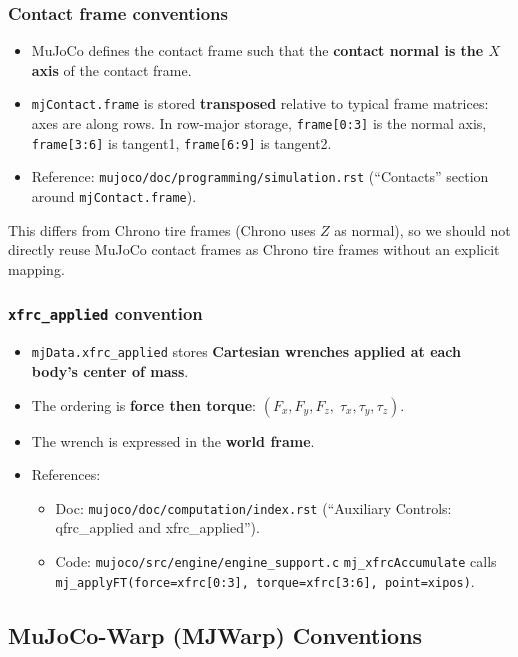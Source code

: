 \subsubsection{Contact frame conventions}
\begin{itemize}
  \item MuJoCo defines the contact frame such that the \textbf{contact normal is the $X$ axis} of the contact frame.
  \item \texttt{mjContact.frame} is stored \textbf{transposed} relative to typical frame matrices: axes are along rows.
        In row-major storage, \texttt{frame[0:3]} is the normal axis, \texttt{frame[3:6]} is tangent1, \texttt{frame[6:9]} is tangent2.
  \item Reference: \texttt{mujoco/doc/programming/simulation.rst} (``Contacts'' section around \texttt{mjContact.frame}).
\end{itemize}
\noindent
This differs from Chrono tire frames (Chrono uses $Z$ as normal), so we should not directly reuse MuJoCo contact frames
as Chrono tire frames without an explicit mapping.

\subsubsection{\texttt{xfrc\_applied} convention}
\begin{itemize}
  \item \texttt{mjData.xfrc\_applied} stores \textbf{Cartesian wrenches applied at each body's center of mass}.
  \item The ordering is \textbf{force then torque}: $(F_x,F_y,F_z,\;\tau_x,\tau_y,\tau_z)$.
  \item The wrench is expressed in the \textbf{world frame}.
  \item References:
    \begin{itemize}
      \item Doc: \texttt{mujoco/doc/computation/index.rst} (``Auxiliary Controls: qfrc\_applied and xfrc\_applied'').
      \item Code: \texttt{mujoco/src/engine/engine\_support.c} \texttt{mj\_xfrcAccumulate} calls
            \texttt{mj\_applyFT(force=xfrc[0:3], torque=xfrc[3:6], point=xipos)}.
    \end{itemize}
\end{itemize}

\subsection{MuJoCo-Warp (MJWarp) Conventions}

